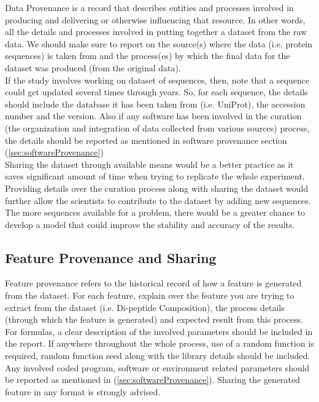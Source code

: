     Data Provenance is a record that describes entities and processes involved in producing and delivering or otherwise influencing 
    that resource.\cite{w3c}  In other words, all the details and processes involved in putting together a dataset from the raw data. 
    We should make sure to report on the source(s) where the data (i.e. protein sequences) is taken from and the process(es) 
    by which the final data for the dataset was produced (from the original data). \\
    
    If the study involves working on dataset of sequences, then, note that a sequence could get updated several times through years. 
    So, for each sequence, the details should include the database it has been taken from (i.e. UniProt), 
    the accession number and the version. Also if any software has been involved in the curation
    (the organization and integration of data collected from various sources) process, 
    the details should be reported as mentioned in software provenance section (\ref{sec:softwareProvenance})\\
    
    
    Sharing the dataset through available means would be a better practice as it saves significant amount of time when
    trying to replicate the whole experiment.
    Providing details over the curation process along with sharing the dataset would further allow the scientists to contribute to the 
    dataset by adding new sequences. The more sequences available for a problem, there would be a greater chance to develop a model 
    that could improve the stability and accuracy of the results.
    
\subsection{Feature Provenance and Sharing}

    Feature provenance refers to the historical record of how a feature is generated from the dataset. For each feature, explain 
    over the feature you are trying to extract from the dataset (i.e. Di-peptide Composition), the process details (through which the 
    feature is generated) and expected result from this process. For formulas, a clear description of the involved parameters should be 
    included in the report. If anywhere throughout the whole process, use of a random function is required, random function seed along 
    with the library details should be included. 
    Any involved coded program, software or environment related parameters should be reported as mentioned in 
    (\ref{sec:softwareProvenance}). Sharing the generated feature in any format is strongly advised.\\
    
